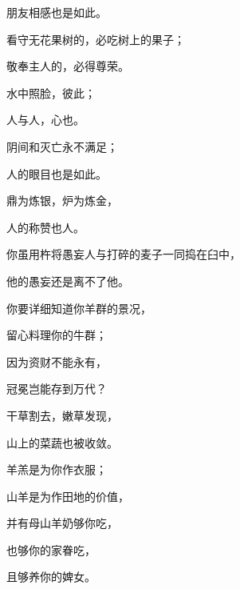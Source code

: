 {\par }{\Q 朋友相感也是如此。
\par }{\Q {}看守无花果树的，必吃树上的果子；
\par }{\Q 敬奉主人的，必得尊荣。
\par }{\Q {}水中照脸，彼此{}；
\par }{\Q 人与人，心也{}。
\par }{\Q {}阴间和灭亡永不满足；
\par }{\Q 人的眼目也是如此。
\par }{\Q {}鼎为炼银，炉为炼金，
\par }{\Q 人的称赞也{}人。
\par }{\Q {}你虽用杵将愚妄人与打碎的麦子一同捣在臼中，
\par }{\Q 他的愚妄还是离不了他。
\par }{\BB \par }{\Q {}你要详细知道你羊群的景况，
\par }{\Q 留心料理你的牛群；
\par }{\Q {}因为资财不能永有，
\par }{\Q 冠冕岂能存到万代？
\par }{\Q {}干草割去，嫩草发现，
\par }{\Q 山上的菜蔬也被收敛。
\par }{\Q {}羊羔{}是为你作衣服；
\par }{\Q 山羊是为作田地的价值，
\par }{\Q {}并有母山羊奶够你吃，
\par }{\Q 也够你的家眷吃，
\par }{\Q 且够养你的婢女。

}
